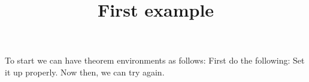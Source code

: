 \documentclass{ximera}
\title{First example}
\begin{document}
\maketitle

To start we can have theorem environments as follows:
First do the following:
Set it up properly.
Now then, we can try again.
\end{document}
